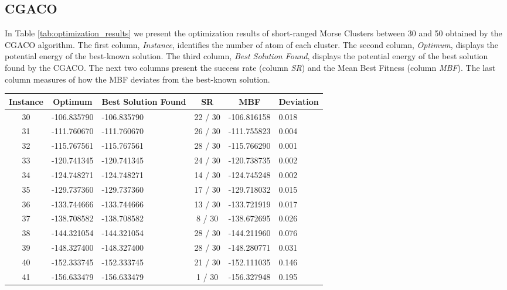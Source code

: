 	\subsection{CGACO}
	In Table \ref{tab:optimization_results} we present the optimization results of short-ranged Morse Clusters between 30 and 50 obtained by the CGACO algorithm. The first column, \emph{Instance}, identifies the number of atom of each cluster. The second column, \emph{Optimum}, displays the potential energy of the best-known solution. The third column, \emph{Best Solution Found}, displays the potential energy of the best solution found by the CGACO. The next two columns present the success rate (column \emph{SR}) and the Mean Best Fitness (column \emph{MBF}). The last column measures of how the MBF deviates from the best-known solution.
	\begin{table}[!htbp]
		\begin{center}
			\begin{tabular}{| c | c | p{3cm} | c | c | p{2cm} |}
				\hline
				\textbf{Instance} & \textbf{Optimum} & \textbf{Best Solution Found} & \textbf{SR} & \textbf{MBF} & \textbf{Deviation}\\ \hline
				30 & -106.835790 & -106.835790 & 22 / 30 & -106.816158 & 0.018 \\ \hline
				31 & -111.760670 & -111.760670 & 26 / 30 & -111.755823 & 0.004 \\ \hline
				32 & -115.767561 & -115.767561 & 28 / 30 & -115.766290 & 0.001 \\ \hline
				33 & -120.741345 & -120.741345 & 24 / 30 & -120.738735 & 0.002 \\ \hline
				34 & -124.748271 & -124.748271 & 14 / 30 & -124.745248 & 0.002 \\ \hline
				35 & -129.737360 & -129.737360 & 17 / 30 & -129.718032 & 0.015 \\ \hline
				36 & -133.744666 & -133.744666 & 13 / 30 & -133.721919 & 0.017 \\ \hline
				37 & -138.708582 & -138.708582 & 8 / 30 & -138.672695 & 0.026 \\ \hline
				38 & -144.321054 & -144.321054 & 28 / 30 & -144.211960 & 0.076 \\ \hline
				39 & -148.327400 & -148.327400 & 28 / 30 & -148.280771 & 0.031 \\ \hline
				40 & -152.333745 & -152.333745 & 21 / 30 & -152.111035 & 0.146 \\ \hline
				41 & -156.633479 & -156.633479 & 1 / 30 & -156.327948 & 0.195 \\ \hline

\end{tabular}
\end{center}
\end{table}
